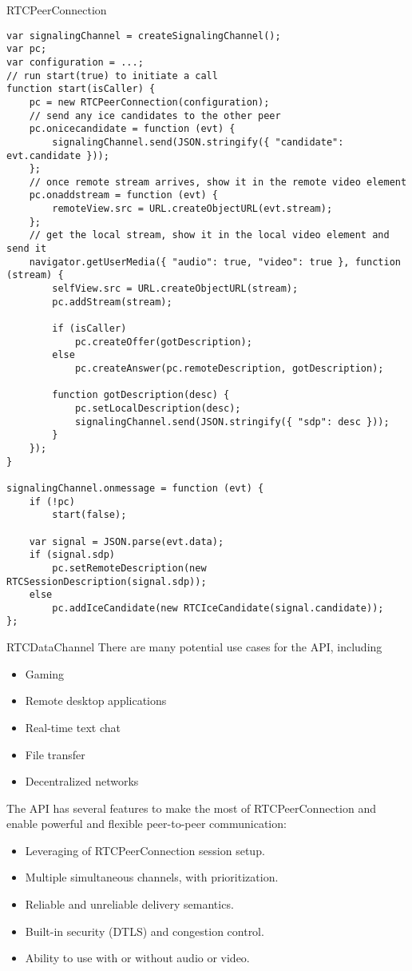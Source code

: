 \begin{frame}{RTCPeerConnection}
\begin{lstlisting}
var signalingChannel = createSignalingChannel();
var pc;
var configuration = ...; 
// run start(true) to initiate a call
function start(isCaller) {
    pc = new RTCPeerConnection(configuration);
    // send any ice candidates to the other peer
    pc.onicecandidate = function (evt) {
        signalingChannel.send(JSON.stringify({ "candidate": evt.candidate }));
    };
    // once remote stream arrives, show it in the remote video element
    pc.onaddstream = function (evt) {
        remoteView.src = URL.createObjectURL(evt.stream);
    };
    // get the local stream, show it in the local video element and send it
    navigator.getUserMedia({ "audio": true, "video": true }, function (stream) {
        selfView.src = URL.createObjectURL(stream);
        pc.addStream(stream);

        if (isCaller)
            pc.createOffer(gotDescription);
        else
            pc.createAnswer(pc.remoteDescription, gotDescription);

        function gotDescription(desc) {
            pc.setLocalDescription(desc);
            signalingChannel.send(JSON.stringify({ "sdp": desc }));
        }
    });
}

signalingChannel.onmessage = function (evt) {
    if (!pc)
        start(false);

    var signal = JSON.parse(evt.data);
    if (signal.sdp)
        pc.setRemoteDescription(new RTCSessionDescription(signal.sdp));
    else
        pc.addIceCandidate(new RTCIceCandidate(signal.candidate));
};
\end{lstlisting}
\end{frame}

\begin{frame}{RTCDataChannel}
There are many potential use cases for the API, including
\begin{itemize}
\item Gaming
\item Remote desktop applications
\item Real-time text chat
\item File transfer
\item Decentralized networks
\end{itemize}
The API has several features to make the most of RTCPeerConnection and enable powerful and flexible peer-to-peer communication:

\begin{itemize}
\item Leveraging of RTCPeerConnection session setup.
\item Multiple simultaneous channels, with prioritization.
\item Reliable and unreliable delivery semantics.
\item Built-in security (DTLS) and congestion control.
\item Ability to use with or without audio or video.
\end{itemize}
\end{frame}

